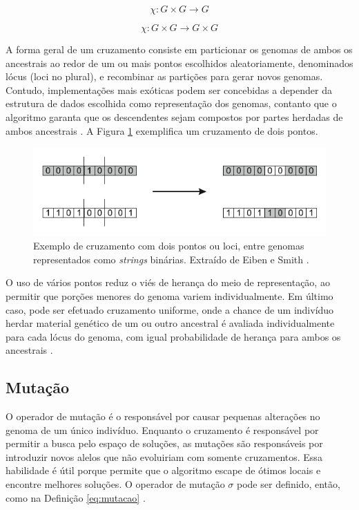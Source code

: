 \documentclass[
	12pt,				%
	openright,			%
	twoside,			%
	a4paper,			%
	tcc,			%
	]{ABNT-DC-UEL}
\begin{document}
\begin{equation}
    \chi : G \times G \to G
    \label{eq:cruzamento-1}
\end{equation}

\begin{equation}
    \chi : G \times G \to G \times G
    \label{eq:cruzamento-2}
\end{equation}

A forma geral de um cruzamento consiste em particionar os genomas de ambos os ancestrais ao redor de um ou mais pontos escolhidos aleatoriamente, denominados lócus (loci no plural), e recombinar as partições para gerar novos genomas. Contudo, implementações mais exóticas podem ser concebidas a depender da estrutura de dados escolhida como representação dos genomas, contanto que o algoritmo garanta que os descendentes sejam compostos por partes herdadas de ambos ancestrais \cite{ashlock:06}. A Figura \ref{fig:crossover} exemplifica um cruzamento de dois pontos.

\begin{figure}[htb]
    \centering
    \includegraphics[scale=1.4]{crossover}
    \caption{Exemplo de cruzamento com dois pontos ou loci, entre genomas representados como \textit{strings} binárias. Extraído de Eiben e Smith \cite{eiben:15}.}
    \label{fig:crossover}
\end{figure}

O uso de vários pontos reduz o viés de herança do meio de representação, ao permitir que porções menores do genoma variem individualmente. Em último caso, pode ser efetuado cruzamento uniforme, onde a chance de um indivíduo herdar material genético de um ou outro ancestral é avaliada individualmente para cada lócus do genoma, com igual probabilidade de herança para ambos os ancestrais \cite{back:00}.

\subsection{Mutação}

O operador de mutação é o responsável por causar pequenas alterações no genoma de um único indivíduo. Enquanto o cruzamento é responsável por permitir a busca pelo espaço de soluções, as mutações são responsáveis por introduzir novos alelos que não evoluiriam com somente cruzamentos. Essa habilidade é útil porque permite que o algoritmo escape de ótimos locais e encontre melhores soluções. O operador de mutação $\sigma$ pode ser definido, então, como na Definição \ref{eq:mutacao} \cite{ashlock:06, eiben:15}.
\end{document}
